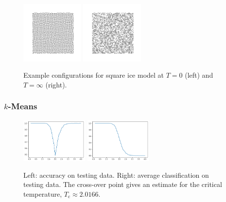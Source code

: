 \documentclass[11pt]{article}
\begin{document}
\begin{figure}[h]
    \centering
    \includegraphics[width=0.28\textwidth]{squareice_images/squareice_T=0.png}
    \includegraphics[width=0.28\textwidth]{squareice_images/squareice_T=inf.png}
    \caption{Example configurations for square ice model at $T=0$ (left) and $T=\infty$ (right).}
    \label{fig:SquareiceExampleConfigs}
\end{figure}

\newpage
\subsubsection{$k$-Means}

\begin{figure}[h]
	\centering
	\includegraphics[width=0.3\textwidth]{squareice_images/kmeans_2d_squareice}
	\includegraphics[width=0.3\textwidth]{squareice_images/kmeans_avg_2d_squareice}
	\caption{Left: accuracy on testing data. Right: average classification on testing data. The cross-over point gives an estimate for the critical temperature, $T_\text{c}\approx 2.0166$.}
\end{figure}
\end{document}
